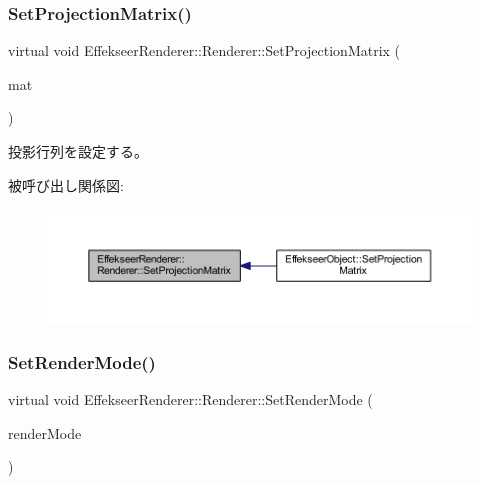 \subsubsection{\texorpdfstring{Set\+Projection\+Matrix()}{SetProjectionMatrix()}}
{\footnotesize\ttfamily virtual void Effekseer\+Renderer\+::\+Renderer\+::\+Set\+Projection\+Matrix (\begin{DoxyParamCaption}\item[{const \+::\mbox{\hyperlink{struct_effekseer_1_1_matrix44}{Effekseer\+::\+Matrix44}} \&}]{mat }\end{DoxyParamCaption})\hspace{0.3cm}{\ttfamily [pure virtual]}}



投影行列を設定する。 

被呼び出し関係図\+:\nopagebreak
\begin{figure}[H]
\begin{center}
\leavevmode
\includegraphics[width=350pt]{class_effekseer_renderer_1_1_renderer_a270c020aeb8cef8b0f1a9a02980d685d_icgraph}
\end{center}
\end{figure}
\mbox{\label{class_effekseer_renderer_1_1_renderer_ab0805785cad223b4a79d2d16fcd9bec8}} 
\subsubsection{\texorpdfstring{Set\+Render\+Mode()}{SetRenderMode()}}
{\footnotesize\ttfamily virtual void Effekseer\+Renderer\+::\+Renderer\+::\+Set\+Render\+Mode (\begin{DoxyParamCaption}\item[{\mbox{\hyperlink{namespace_effekseer_ad1b82893021dd8e3697e46c1aa544092}{Effekseer\+::\+Render\+Mode}}}]{render\+Mode }\end{DoxyParamCaption})\hspace{0.3cm}{\ttfamily [pure virtual]}}




